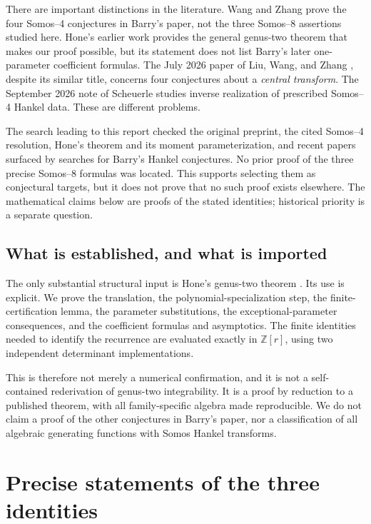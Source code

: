 \documentclass[11pt,letterpaper]{article}
\numberwithin{equation}{section}
\theoremstyle{definition}
\newcommand{\Z}{\mathbb Z}
\begin{document}
There are important distinctions in the literature. Wang and Zhang
\cite{WangZhang} prove the four Somos--4 conjectures in Barry's paper, not the
three Somos--8 assertions studied here. Hone's earlier work \cite{Hone}
provides the general genus-two theorem that makes our proof possible, but its
statement does not list Barry's later one-parameter coefficient formulas.
The July 2026 paper of Liu, Wang, and Zhang \cite{LiuWangZhang}, despite its
similar title, concerns four conjectures about a \emph{central transform}.
The September 2026 note of Scheuerle \cite{Scheuerle} studies inverse
realization of prescribed Somos--4 Hankel data. These are different problems.

The search leading to this report checked the original preprint, the cited
Somos--4 resolution, Hone's theorem and its moment parameterization, and
recent papers surfaced by searches for Barry's Hankel conjectures. No prior
proof of the three precise Somos--8 formulas was located. This supports
selecting them as conjectural targets, but it does not prove that no such
proof exists elsewhere. The mathematical claims below are proofs of the
stated identities; historical priority is a separate question.

\subsection{What is established, and what is imported}

The only substantial structural input is Hone's genus-two theorem
\cite[Theorem 5.4]{Hone}. Its use is explicit. We prove the translation,
the polynomial-specialization step, the finite-certification lemma, the
parameter substitutions, the exceptional-parameter consequences, and the
coefficient formulas and asymptotics. The finite identities needed to
identify the recurrence are evaluated exactly in \(\Z[r]\), using two
independent determinant implementations.

This is therefore not merely a numerical confirmation, and it is not a
self-contained rederivation of genus-two integrability. It is a proof by
reduction to a published theorem, with all family-specific algebra made
reproducible. We do not claim a proof of the other conjectures in Barry's
paper, nor a classification of all algebraic generating functions with
Somos Hankel transforms.

\section{Precise statements of the three identities}
\label{sec:main}
\end{document}
